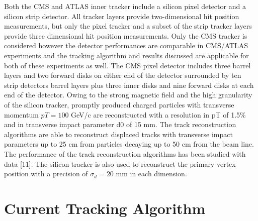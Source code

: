 \documentclass{JINST}
\begin{document}
Both the CMS and ATLAS inner tracker include a silicon pixel detector and a silicon strip detector.
All tracker layers provide two-dimensional hit position measurements, but only the pixel tracker
 and a subset of the strip tracker layers provide three dimensional hit position measurements.
Only the CMS tracker is considered however the detector performances are comparable
in CMS/ATLAS experiments and the tracking algorithm and results discussed are applicable for both of 
these experiments as well. The CMS pixel detector includes three barrel layers and two forward disks
on either end of the detector surrounded by  ten strip detectors barrel layers plus three 
inner disks and nine forward disks at each end of the detector.
Owing to the strong magnetic field and the high granularity of the silicon tracker, 
promptly produced charged particles with transverse momentum $pT = 100$ GeV/c are reconstructed 
with a resolution in pT of 1.5\% and in transverse impact
parameter d0 of 15 mm. The track reconstruction algorithms are able to reconstruct displaced
tracks with transverse impact parameters up to 25 cm from particles decaying up to 50 cm
from the beam line. The performance of the track reconstruction algorithms has been studied
with data [11]. The silicon tracker is also used to reconstruct the primary vertex position with
 a precision of $\sigma_d = 20$ mm in each dimension. 

\section{Current Tracking Algorithm}
\end{document}

